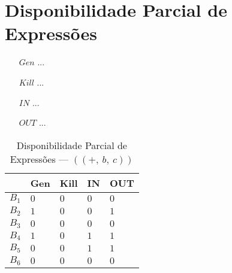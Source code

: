 \section{Disponibilidade Parcial de Express\~oes}

\begin{itemize}
  \item[$Gen$] ...
  \item[$Kill$] ...
  \item[$IN$] ...
  \item[$OUT$] ...
\end{itemize}

\begin{table}[ht]
\centering
\begin{tabular}{l|l|l|l|l}
	& Gen & Kill & IN & OUT\\
\hline
$B_{1}$ &  $0$ & $0$ & $0$ & $0$\\
$B_{2}$ &  $1$ & $0$ & $0$ & $1$\\
$B_{3}$ &  $0$ & $0$ & $0$ & $0$\\
$B_{4}$ &  $1$ & $0$ & $1$ & $1$\\
$B_{5}$ &  $0$ & $0$ & $1$ & $1$\\
$B_{6}$ &  $0$ & $0$ & $0$ & $0$\\
\end{tabular}
\caption{Disponibilidade Parcial de Express\~oes --- $((+,\:b,\:c))$}
\end{table}

